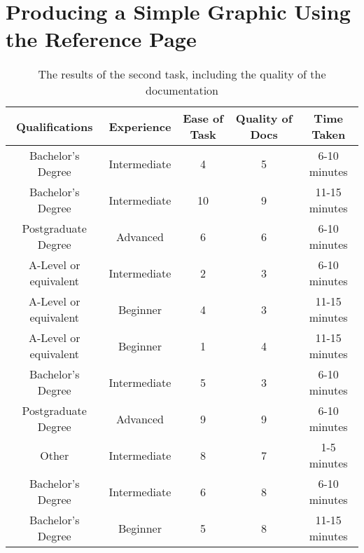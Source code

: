 \documentclass[../main.tex]{subfiles}
\begin{document}
        \section*{Producing a Simple Graphic Using the Reference Page}
            \begin{table}[H]
                \centering
                \begin{tabular}{c|c|c|c|c}
                    \textbf{Qualifications} & \textbf{Experience} & \textbf{Ease of Task} & \textbf{Quality of Docs} & \textbf{Time Taken} \\
                    \hline
                    Bachelor's Degree       & Intermediate        & 4                     & 5                        & 6-10 minutes        \\
                    Bachelor's Degree       & Intermediate        & 10                    & 9                        & 11-15 minutes       \\
                    Postgraduate Degree     & Advanced            & 6                     & 6                        & 6-10 minutes        \\
                    A-Level or equivalent   & Intermediate        & 2                     & 3                        & 6-10 minutes        \\
                    A-Level or equivalent   & Beginner            & 4                     & 3                        & 11-15 minutes       \\
                    A-Level or equivalent   & Beginner            & 1                     & 4                        & 11-15 minutes       \\
                    Bachelor's Degree       & Intermediate        & 5                     & 3                        & 6-10 minutes        \\
                    Postgraduate Degree     & Advanced            & 9                     & 9                        & 6-10 minutes        \\
                    Other                   & Intermediate        & 8                     & 7                        & 1-5 minutes         \\
                    Bachelor's Degree       & Intermediate        & 6                     & 8                        & 6-10 minutes        \\
                    Bachelor's Degree       & Beginner            & 5                     & 8                        & 11-15 minutes       \\
                \end{tabular}
                \caption{The results of the second task, including the quality of the documentation}
            \end{table}
\end{document}
